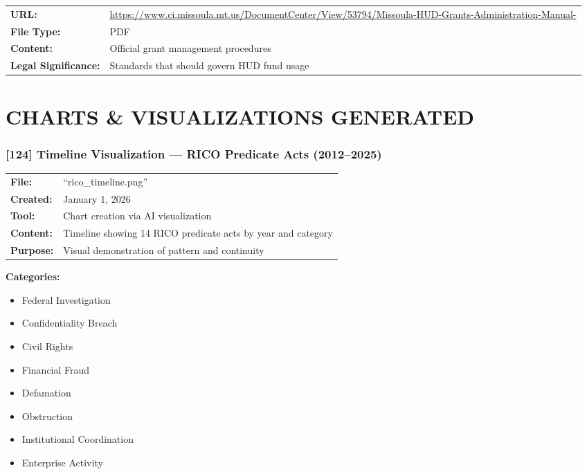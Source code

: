 \documentclass[11pt,letterpaper]{article}
\newcommand{\citeref}[1]{\textbf{\color{NavyBlue}[#1]}}
\begin{document}
\begin{tabular}{@{}p{1.4in}p{4.6in}@{}}
\textbf{URL:} & \url{https://www.ci.missoula.mt.us/DocumentCenter/View/53794/Missoula-HUD-Grants-Administration-Manual-}\\
\textbf{File Type:} & PDF\\
\textbf{Content:} & Official grant management procedures\\
\textbf{Legal Significance:} & Standards that should govern HUD fund usage\\
\end{tabular}

\newpage

\section{CHARTS \& VISUALIZATIONS GENERATED}

\subsubsection{\citeref{124} Timeline Visualization --- RICO Predicate Acts (2012--2025)}

\begin{tabular}{@{}p{1.4in}p{4.6in}@{}}
\textbf{File:} & ``rico\_timeline.png''\\
\textbf{Created:} & January 1, 2026\\
\textbf{Tool:} & Chart creation via AI visualization\\
\textbf{Content:} & Timeline showing 14 RICO predicate acts by year and category\\
\textbf{Purpose:} & Visual demonstration of pattern and continuity\\
\end{tabular}

\vspace{0.1in}

\textbf{Categories:}
\begin{itemize}[leftmargin=*]
\item Federal Investigation
\item Confidentiality Breach
\item Civil Rights
\item Financial Fraud
\item Defamation
\item Obstruction
\item Institutional Coordination
\item Enterprise Activity
\end{itemize}
\end{document}
